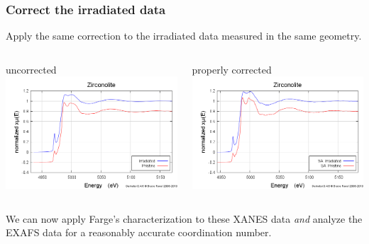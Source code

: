 \documentclass[10pt, xcolor=x11names, compress]{beamer}
\begin{document}
\begin{frame}
  \frametitle{Correct the irradiated data}
  Apply the same correction to the irradiated data measured in the same geometry.
  \begin{columns}
    \begin{column}{0.5\linewidth}
      \begin{center}
        uncorrected\\
        \includegraphics[width=0.8\linewidth]{images/pristine_irrad.png}
      \end{center}
    \end{column}
    \begin{column}{0.5\linewidth}
      \begin{center}
        properly corrected\\
        \includegraphics[width=0.8\linewidth]{images/zirconolite_fixed.png}
      \end{center}
    \end{column}
  \end{columns}

  \bigskip

  We can now apply Farge's characterization to these XANES data
  \textit{and} analyze the EXAFS data for a reasonably accurate
  coordination number.


\end{frame}
\end{document}
